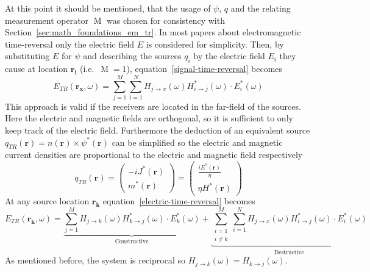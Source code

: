 At this point it should be mentioned, that the usage of \(\psi \), \(q\) and the relating measurement operator \(\operatorname{M}\) was chosen for consistency with Section~\ref{sec:math_foundations_em_tr}.
In most papers about electromagnetic time-reversal only the electric field \(E\) is considered for simplicity.
Then, by substituting \(E\) for \(\psi \) and describing the sources \(q_i\) by the electric field \(E_i\) they cause at location \(\mathbf{r_i}\) (i.e.~\(\operatorname{M}=1\)), equation~\eqref{signal-time-reversal} becomes
\begin{equation}\label{electric-time-reversal}
    E_{TR}(\mathbf{r_x}, \omega) = \sum_{j=1}^{M} \sum_{i=1}^{N} H_{j\rightarrow x}(\omega )  H^*_{i\rightarrow j}(\omega) \cdot E^*_i(\omega)
\end{equation}
This approach is valid if the receivers are located in the far-field of the sources.
Here the electric and magnetic fields are orthogonal, so it is sufficient to only keep track of the electric field.
Furthermore the deduction of an equivalent source \(q_{TR}(\mathbf{r}) = n(\mathbf{r}) \times \psi^*(\mathbf{r})\) can be simplified so the electric and magnetic current densities are proportional to the electric and magnetic field respectively~\parencite{de_rosny_theory_2010}
\begin{equation}
    q_{T R}(\mathbf{r})= \begin{pmatrix}
        -i J^*(\mathbf{r}) \\
        m^*(\mathbf{r})
    \end{pmatrix} =\left(\begin{array}{c}
        \frac{i E^*(\mathbf{r})}{\eta} \\
        \eta H^*(\mathbf{r})
        \end{array}\right)
\end{equation}
At any source location \(\mathbf{r_k}\) equation~\eqref{electric-time-reversal} becomes
\begin{equation}\label{electric-time-reversal-source}
    E_{TR}(\mathbf{r_k}, \omega) = \underbrace{\sum_{j=1}^{M} H_{j\rightarrow k}(\omega) H^*_{k\rightarrow j}(\omega) \cdot E^*_k(\omega)}_{\text{Constructive}} + \underbrace{\sum_{\substack{i=1 \\ i \neq k}}^{M} \sum_{i=1}^{N} H_{j\rightarrow x}(\omega ) H^*_{i\rightarrow j}(\omega) \cdot E^*_i(\omega)}_{\text{Destructive}}
\end{equation}
As mentioned before, the system is reciprocal so \(H_{j\rightarrow k}(\omega )= H_{k\rightarrow j}(\omega )\). 
